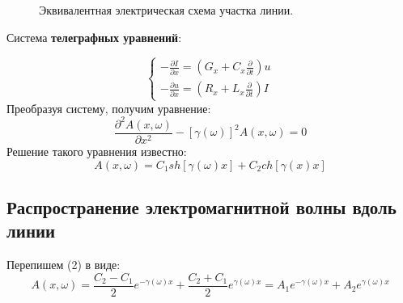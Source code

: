\documentclass[12pt]{article}
\begin{document}
\begin{flushleft}
\begin{figure}[h]
\caption{Эквивалентная электрическая схема участка линии.}
\label{ris:image}
\end{figure}

Система \textbf{телеграфных уравнений}:

\begin{equation}
\begin{cases}
-\frac{\partial I}{\partial x} = \left( G_{x} + C_{x} \frac{\partial}{\partial t} \right) u \\
-\frac{\partial u}{\partial x} = \left( R_{x} + L_{x} \frac{\partial}{\partial t} \right) I
 \end{cases}
\end{equation}
Преобразуя систему, получим уравнение:
\begin{equation}
\frac{\partial^2 A(x, \omega)}{\partial x^2} - \left[ \gamma(\omega)\right]^2 A(x, \omega)= 0
\end{equation}
Решение такого уравнения известно:
\begin{equation}
A(x, \omega) = C_{1}sh[\gamma(\omega)x]+ C_{2}ch[\gamma(x)x]
\end{equation}
\subsection{Распространение электромагнитной волны вдоль линии}
Перепишем (2) в виде:
\begin{equation}
A(x,\omega)=\frac{C_2 - C_1}{2}e^{-\gamma(\omega)x} + \frac{C_2 + C_1}{2}e^{\gamma(\omega)x} = A_1e^{-\gamma(\omega)x} + A_2e^{\gamma(\omega)x}
\end{equation}


\end{flushleft}
\end{document}
